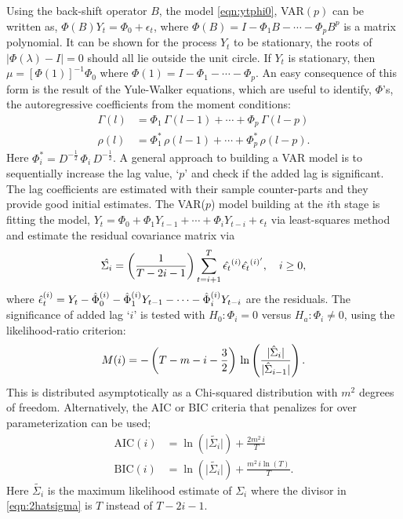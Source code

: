 Using the back-shift operator $B$, the model \eqref{eqn:ytphi0}, VAR$(p)$ can be written as, $ \Phi(B)Y_t= \Phi_0 + \epsilon_t$, where $\Phi(B)= I - \Phi_1 B - \cdots - \Phi_p B^p$ is a matrix polynomial. It can be shown for the process $Y_t$ to be stationary, the roots of $\lvert \Phi(\lambda)-I \rvert= 0$ should all lie outside the unit circle. If $Y_t$ is stationary, then $\mu= [\Phi(1)]^{-1} \Phi_0$ where $\Phi(1)= I - \Phi_1 - \cdots - \Phi_p$. An easy consequence of this form is the result of the Yule-Walker equations, which are useful to identify, $\Phi$'s, the autoregressive coefficients from the moment conditions:
	\begin{equation} \label{eqn:2gammarho}
	\begin{split}
	\Gamma(l)&= \Phi_1 \,\Gamma(l-1) +\cdots + \Phi_p\, \Gamma(l-p) \\
	\rho(l)&= \Phi_1^* \,\rho(l-1) + \cdots + \Phi_p^* \, \rho(l-p).
	\end{split}
	\end{equation}
Here $\Phi_i^*= D^{-\frac{1}{2}} \,\Phi_i\, D^{-\frac{1}{2}}$. A general approach to building a VAR model is to sequentially increase the lag value, `$p$' and check if the added lag is significant. The lag coefficients are estimated with their sample counter-parts and they provide good initial estimates. The VAR($p$) model building at the $i$th stage is fitting the model, $Y_t= \Phi_0 + \Phi_1 Y_{t-1} + \cdots + \Phi_i Y_{t-i} + \epsilon_t$ via least-squares method and estimate the residual covariance matrix via
	\begin{equation} \label{eqn:2hatsigma}
	\hat{\Sigma_i} = \left( \frac{1}{T-2i-1} \right) \sum_{t=i+1}^{T}\Hat{\epsilon_t}^{(i)}{{\hat{\epsilon_t}^{(i)^\prime}}}, \quad i \geq 0,
	\end{equation}
where $ \Hat{\epsilon}_t^{(i)}= Y_t - \Hat{\Phi}_0^{(i)} - \Hat{\Phi}_1^{(i)}Y_{t-1} - \cdots - \Hat{\Phi}_i^{(i)}Y_{t-i}$ are the residuals. The significance of added lag `$i$' is tested with $H_0: \Phi_i= 0$ versus $H_a: \Phi_i \neq 0$, using the likelihood-ratio criterion:
	\begin{equation} \label{eqn:2mi}
	M(i)= -\left(T - m - i - \frac{3}{2}\right)\, \ln\left( \frac{\lvert \Hat{\Sigma}_i \rvert}{\lvert \Hat{\Sigma}_{i-1} \rvert}\right).
	\end{equation}
This is distributed asymptotically as a Chi-squared distribution with $m^2$ degrees of freedom. Alternatively, the AIC or BIC criteria that penalizes for over parameterization can be used; 
	\begin{equation} \label{eqn:2aicbic}
	\begin{split}
	\text{AIC}(i)&= \ln\left(\lvert\tilde{\Sigma_i} \rvert \right)+\frac{2m^2\,i}{T} \\
	\text{BIC}(i)&= \ln\left( \lvert \tilde{\Sigma_i} \rvert \right)+\frac{m^2\,i \ln(T)}{T}.
	\end{split}
	\end{equation}
Here $\tilde{\Sigma_i}$ is the maximum likelihood estimate of $\Sigma_i$ where the divisor in \eqref{eqn:2hatsigma} is $T$ instead of $T - 2i - 1$.


